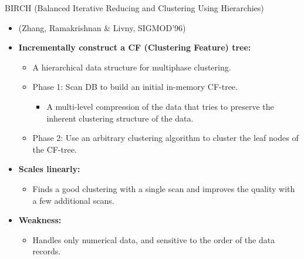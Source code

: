 \documentclass[aspectratio=169,t,xcolor=dvipsnames]{beamer}
\begin{document}
  { %
    \begin{frame}{BIRCH (Balanced Iterative Reducing and Clustering Using Hierarchies)}
      \begin{itemize}
        \item (Zhang, Ramakrishnan \& Livny, SIGMOD'96)
        \item \textbf{Incrementally construct a CF (Clustering Feature) tree:}
        \begin{itemize}
          \item A hierarchical data structure for multiphase clustering.
          \item Phase 1: Scan DB to build an initial in-memory CF-tree.
          \begin{itemize}
            \item A multi-level compression of the data that tries to preserve the inherent clustering structure of the data.
          \end{itemize}
          \item Phase 2: Use an arbitrary clustering algorithm to cluster the leaf nodes of the CF-tree.
        \end{itemize}
        \item \textbf{Scales linearly:}
        \begin{itemize}
          \item Finds a good clustering with a single scan and improves the quality with a few additional scans.
        \end{itemize}
        \item \textbf{Weakness:}
        \begin{itemize}
          \item Handles only numerical data, and sensitive to the order of the data records.
        \end{itemize}
      \end{itemize}
    \end{frame}
  }
\end{document}
